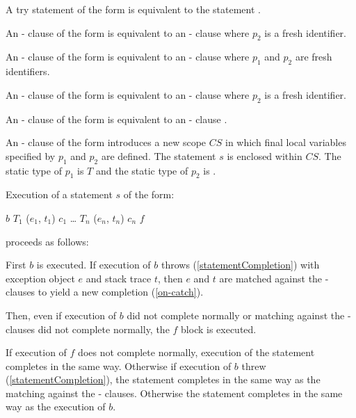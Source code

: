 \documentclass[makeidx]{article}
\begin{document}
{\LMHash{}%
A try statement of the form
is equivalent to the statement
.

\LMHash{}%
An \ON{}-\CATCH{} clause of the form
is equivalent to an \ON{}-\CATCH{} clause
where $p_2$ is a fresh identifier.

\LMHash{}%
An \ON{}-\CATCH{} clause of the form
is equivalent to an \ON{}-\CATCH{} clause
where $p_1$ and $p_2$ are fresh identifiers.

\LMHash{}%
An \ON{}-\CATCH{} clause of the form
is equivalent to an \ON{}-\CATCH{} clause
where $p_2$ is a fresh identifier.

An \ON{}-\CATCH{} clause of the form
is equivalent to an \ON{}-\CATCH{} clause
.

\LMHash{}%
An \ON{}-\CATCH{} clause of the form
introduces a new scope $CS$ in which final local variables
specified by $p_1$ and $p_2$ are defined.
The statement $s$ is enclosed within $CS$.
The static type of $p_1$ is $T$
and the static type of $p_2$ is .

\LMHash{}%
Execution of a \TRY{} statement $s$ of the form:

\begin{normativeDartCode}
\TRY{} $b$
\ON{} $T_1$ \CATCH{} ($e_1$, $t_1$) $c_1$
\ldots{}
\ON{} $T_n$ \CATCH{} ($e_n$, $t_n$) $c_n$
\FINALLY{} $f$
\end{normativeDartCode}

\noindent
proceeds as follows:

\LMHash{}%
First $b$ is executed.
If execution of $b$ throws (\ref{statementCompletion})
with exception object $e$ and stack trace $t$,
then $e$ and $t$ are matched against the \ON{}-\CATCH{} clauses
to yield a new completion (\ref{on-catch}).

Then, even if execution of $b$ did not complete normally
or matching against the \ON{}-\CATCH{} clauses did not complete normally,
the $f$ block is executed.

If execution of $f$ does not complete normally,
execution of the \TRY{} statement completes in the same way.
Otherwise if execution of $b$ threw (\ref{statementCompletion}),
the \TRY{} statement completes in the same way as
the matching against the \ON{}-\CATCH{} clauses.
Otherwise the \TRY{} statement completes in the same way as
the execution of $b$.

}
\end{document}
